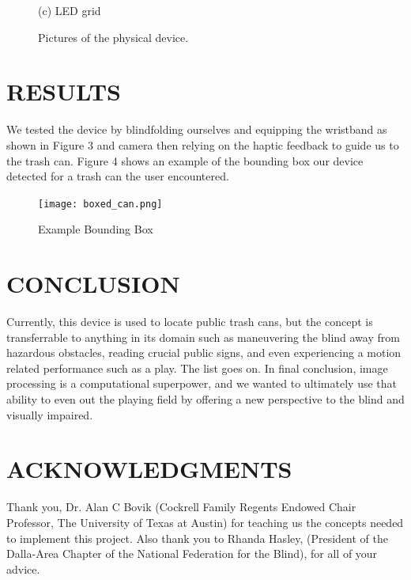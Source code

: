 \documentclass{article}
\begin{document}
\begin{center}
\begin{figure}[ht]
\begin{minipage}[b]{0.48\linewidth}
  \centerline{(c) LED grid}\medskip
\end{minipage}
%
\caption{Pictures of the physical device.}
\label{figures}
%
\end{figure}
\end{center}



\section{RESULTS}
\label{sec:results}
We tested the device by blindfolding ourselves and equipping the wristband as shown in Figure 3 and camera then relying on the haptic feedback to guide us to the trash can. Figure 4 shows an example of the bounding box our device detected for a trash can the user encountered.
\begin{figure}[ht]
    \centering
    \texttt{[image: boxed\_can.png]}
    \caption{\label{fig:3} Example Bounding Box}
\end{figure}


\section{CONCLUSION}
\label{sec:conclusion}

Currently, this device is used to locate public trash cans, but the concept is transferrable to anything in its domain such as maneuvering the blind away from hazardous obstacles, reading crucial public signs, and even experiencing a motion related performance such as a play. The list goes on. In final conclusion, image processing is a computational superpower, and we wanted to ultimately use that ability to even out the playing field by offering a new perspective to the blind and visually impaired. 

\section{ACKNOWLEDGMENTS}
\label{sec:ack}

Thank you, Dr. Alan C Bovik (Cockrell Family Regents Endowed Chair Professor, The University of Texas at Austin) for teaching us the concepts needed to implement this project. Also thank you to Rhanda Hasley, (President of the Dalla-Area Chapter of the National Federation for the Blind), for all of your advice.






\end{document}
